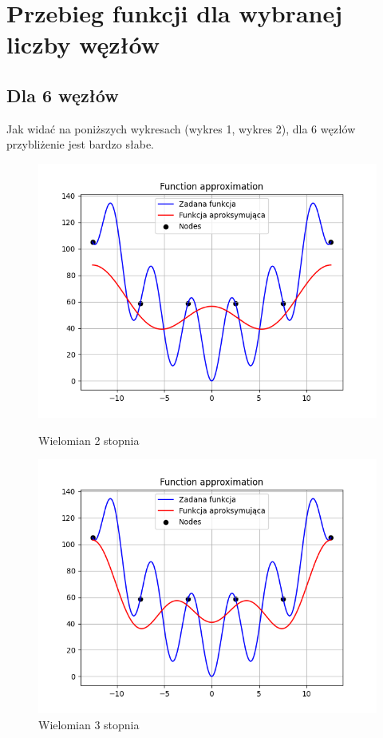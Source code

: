 \documentclass{article}
\begin{document}
\section{Przebieg funkcji dla wybranej liczby węzłów}

\subsection{Dla 6 węzłów}

\noindent
Jak widać na poniższych wykresach (wykres 1, wykres 2), dla 6 węzłów przybliżenie jest bardzo słabe.

\begin{figure}[H]
  \begin{minipage}[b]{0.49\textwidth}
    \includegraphics[width=\textwidth]{img01.png}
    \caption{Wielomian 2 stopnia}
  \end{minipage}
  \hfill
  \begin{minipage}[b]{0.49\textwidth}
    \includegraphics[width=\textwidth]{img02.png}
    \caption{Wielomian 3 stopnia}
  \end{minipage}
\end{figure}
\end{document}
